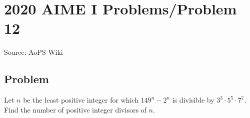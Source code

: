 \documentclass[12pt]{article}
\begin{document}
\section*{{2020 AIME I Problems/Problem 12}}
Source: AoPS Wiki

\subsection*{Problem}
Let $n$ be the least positive integer for which $149^n-2^n$ is divisible by $3^3\cdot5^5\cdot7^7.$ Find the number of positive integer divisors of $n.$
\end{document}
